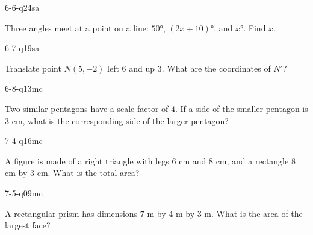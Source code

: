 \begin{practiceQuestion}{6-6-q24}{sa}
\begin{questionText}
Three angles meet at a point on a line: $50°$, $(2x + 10)°$, and $x°$. Find $x$.
\end{questionText}
\end{practiceQuestion}

\begin{practiceQuestion}{6-7-q19}{sa}
\begin{questionText}
Translate point $N(5, -2)$ left $6$ and up $3$. What are the coordinates of $N'$?
\end{questionText}
\end{practiceQuestion}

\begin{practiceQuestion}{6-8-q13}{mc}
\begin{questionText}
Two similar pentagons have a scale factor of $4$. If a side of the smaller pentagon is $3$ cm, what is the corresponding side of the larger pentagon?
\end{questionText}
\end{practiceQuestion}

\begin{practiceQuestion}{7-4-q16}{mc}
\begin{questionText}
A figure is made of a right triangle with legs $6$ cm and $8$ cm, and a rectangle $8$ cm by $3$ cm. What is the total area?
\end{questionText}
\end{practiceQuestion}

\begin{practiceQuestion}{7-5-q09}{mc}
\begin{questionText}
A rectangular prism has dimensions $7$ m by $4$ m by $3$ m. What is the area of the largest face?
\end{questionText}
\end{practiceQuestion}

